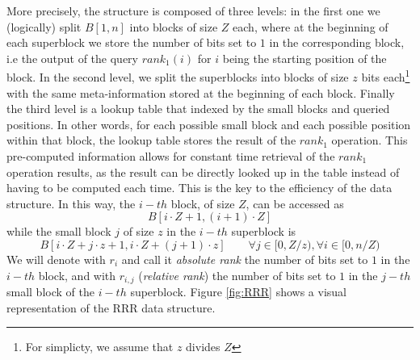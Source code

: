 \noindent More precisely, the structure is composed of three levels: in the first one we (logically) split $B[1, n]$ into blocks of size $Z$ each, where at the beginning of each superblock we store the number of bits set to $1$ in the corresponding block, i.e the output of the query $rank_1(i)$ for $i$ being the starting position of the block. In the second level, we split the superblocks into blocks of size $z$ bits each\footnote{For simplicty, we assume that $z$ divides $Z$} with the same meta-information stored at the beginning of each block. Finally the third level is a lookup table that indexed by the small blocks and queried positions. In other words, for each possible small block and each possible position within that block, the lookup table stores the result of the $rank_1$ operation. This pre-computed information allows for constant time retrieval of the $rank_1$ operation results, as the result can be directly looked up in the table instead of having to be computed each time. This is the key to the efficiency of the data structure. In this way, the $i-th$ block, of size $Z$, can be accessed as
\[
    B[i \cdot Z + 1, (i+1) \cdot Z]
\]
while the small block $j$ of size $z$ in the $i-th$ superblock is
\[
    B[i \cdot Z + j \cdot z + 1, i \cdot Z + (j+1) \cdot z] \qquad \forall j \in [0, Z/z), \forall i \in [0, n/Z)
\]
We will denote with $r_i$ and call it \emph{absolute rank} the number of bits set to $1$ in the $i-th$ block, and with $r_{i,j}$ (\emph{relative rank}) the number of bits set to $1$ in the $j-th$ small block of the $i-th$ superblock. Figure \ref{fig:RRR} shows a visual representation of the RRR data structure.

